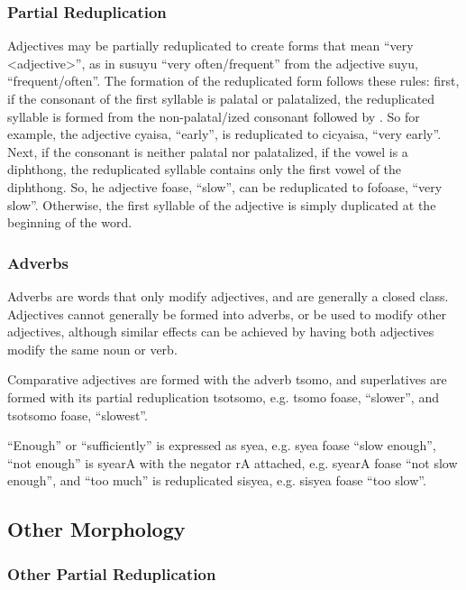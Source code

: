 \documentclass{article}
\begin{document}
\subsubsection{Partial Reduplication}

Adjectives may be partially reduplicated to create forms that mean ``very <adjective>'', as in {\quch susuyu} ``very often/frequent'' from the adjective {\quch suyu}, ``frequent/often''.  The formation of the reduplicated form follows these rules: first, if the consonant of the first syllable is palatal or palatalized, the reduplicated syllable is formed from the non-palatal/ized consonant followed by . So for example, the adjective {\quch cyaisa}, ``early'', is reduplicated to {\quch cicyaisa}, ``very early''. Next, if the consonant is neither palatal nor palatalized, if the vowel is a diphthong, the reduplicated syllable contains only the first vowel of the diphthong. So, he adjective {\quch foase}, ``slow'', can be reduplicated to {\quch fofoase}, ``very slow''.  Otherwise, the first syllable of the adjective is simply duplicated at the beginning of the word.

\subsubsection{Adverbs}

Adverbs are words that only modify adjectives, and are generally a closed class. Adjectives cannot generally be formed into adverbs, or be used to modify other adjectives, although similar effects can be achieved by having both adjectives modify the same noun or verb.

Comparative adjectives are formed with the adverb {\quch tsomo}, and superlatives are formed with its partial reduplication {\quch tsotsomo}, e.g. {\quch tsomo foase}, ``slower'', and {\quch tsotsomo foase}, ``slowest''.

``Enough'' or ``sufficiently'' is expressed as {\quch syea}, e.g. {\quch syea foase} ``slow enough'', ``not enough'' is {\quch syearA} with the negator {\quch rA} attached, e.g. {\quch syearA foase} ``not slow enough'', and ``too much'' is reduplicated {\quch sisyea}, e.g. {\quch sisyea foase} ``too slow''.

\subsection{Other Morphology}
\subsubsection{Other Partial Reduplication}
\end{document}

